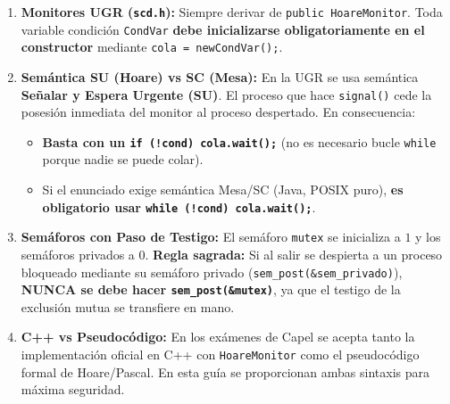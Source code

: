 \documentclass[11pt,a4paper]{article}
\begin{document}
\vspace{0.1cm}

\begin{tcolorbox}[colback=scdLightAccent,colframe=scdPrimary,title=\textbf{Las 4 Reglas de Oro de Capel para el Examen (Monitores y Semáforos)},arc=3pt]
\small
\begin{enumerate}[leftmargin=*,itemsep=1.5pt]
    \item \textbf{Monitores UGR (\texttt{scd.h}):} Siempre derivar de \texttt{public HoareMonitor}. Toda variable condición \texttt{CondVar} \textbf{debe inicializarse obligatoriamente en el constructor} mediante \texttt{cola = newCondVar();}.
    \item \textbf{Semántica SU (Hoare) vs SC (Mesa):} En la UGR se usa semántica \textbf{Señalar y Espera Urgente (SU)}. El proceso que hace \texttt{signal()} cede la posesión inmediata del monitor al proceso despertado. En consecuencia:
    \begin{itemize}[leftmargin=*,itemsep=0.5pt]
        \item \textbf{Basta con un \texttt{if (!cond) cola.wait();}} (no es necesario bucle \texttt{while} porque nadie se puede colar).
        \item Si el enunciado exige semántica Mesa/SC (Java, POSIX puro), \textbf{es obligatorio usar \texttt{while (!cond) cola.wait();}}.
    \end{itemize}
    \item \textbf{Semáforos con Paso de Testigo:} El semáforo \texttt{mutex} se inicializa a $1$ y los semáforos privados a $0$. \textbf{Regla sagrada:} Si al salir se despierta a un proceso bloqueado mediante su semáforo privado (\texttt{sem\_post(\&sem\_privado)}), \textbf{NUNCA se debe hacer \texttt{sem\_post(\&mutex)}}, ya que el testigo de la exclusión mutua se transfiere en mano.
    \item \textbf{C++ vs Pseudocódigo:} En los exámenes de Capel se acepta tanto la implementación oficial en C++ con \texttt{HoareMonitor} como el pseudocódigo formal de Hoare/Pascal. En esta guía se proporcionan ambas sintaxis para máxima seguridad.
\end{enumerate}
\end{tcolorbox}

\vspace{0.1cm}
\end{document}
